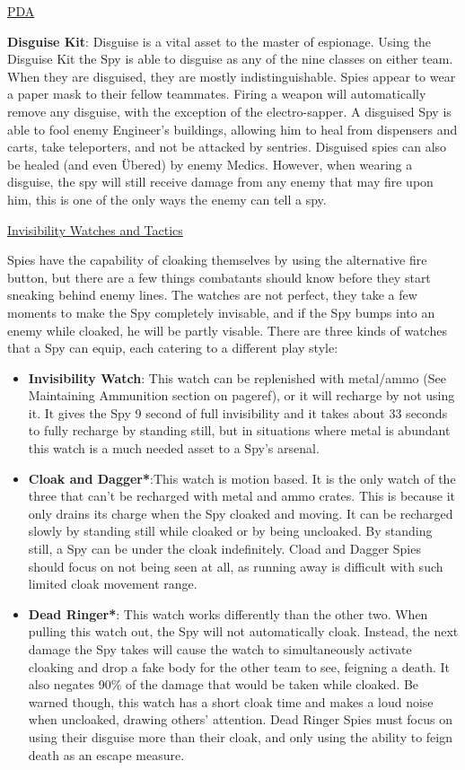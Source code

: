 \begin {center}
\underline {PDA}
\end {center}

{\bf Disguise Kit}: Disguise is a vital asset to the master of espionage.  Using the Disguise Kit the Spy is able to disguise as any of the nine classes on either team. When they are disguised, they are mostly indistinguishable.  Spies appear to wear a paper mask to their fellow teammates. Firing a weapon will automatically remove any disguise, with the exception of the electro-sapper. A disguised Spy is able to fool enemy Engineer's buildings, allowing him to heal from dispensers and carts, take teleporters, and not be attacked by sentries.  Disguised spies can also be healed (and even Übered) by enemy Medics. However, when wearing a disguise, the spy will still receive damage from any enemy that may fire upon him, this is one of the only ways the enemy can tell a spy.

\begin {center}
\underline {Invisibility Watches and Tactics}
\end {center}

 Spies have the capability of cloaking themselves by using the alternative fire button, but there are a few things combatants should know before they start sneaking behind enemy lines. The watches are not perfect, they take a few moments to make the Spy completely invisable, and if the Spy bumps into an enemy while cloaked, he will be partly visable. There are three kinds of watches that a Spy can equip, each catering to a different play style:
\begin {itemize}
\item {\bf Invisibility Watch}: This watch can be replenished with metal/ammo (See Maintaining Ammunition section on {{pageref}}), or it will recharge by not using it. It gives the Spy 9 second of full invisibility and it takes about 33 seconds to fully recharge by standing still, but in situations where metal is abundant this watch is a much needed asset to a Spy's arsenal.
\item {\bf Cloak and Dagger*}:This watch is motion based. It is the only watch of the three that can't be recharged with metal and ammo crates. This is because it only drains its charge when the Spy cloaked and moving. It can be recharged slowly by standing still while cloaked or by being uncloaked. By standing still, a Spy can be under the cloak indefinitely. Cload and Dagger Spies should focus on not being seen at all, as running away is difficult with such limited cloak movement range.
\item {\bf Dead Ringer*}: This watch works differently than the other two. When pulling this watch out, the Spy will not automatically cloak. Instead, the next damage the Spy takes will cause the watch to simultaneously activate cloaking and drop a fake body for the other team to see, feigning a death. It also negates 90\% of the damage that would be taken while cloaked. Be warned though, this watch has a short cloak time and makes a loud noise when uncloaked, drawing others' attention. Dead Ringer Spies must focus on using their disguise more than their cloak, and only using the ability to feign death as an escape measure.
\end {itemize}
